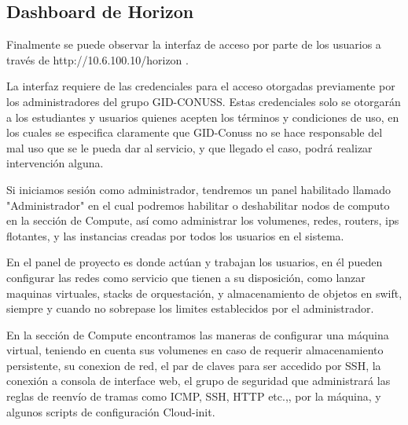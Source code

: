     \subsection{Dashboard de Horizon}
    
    Finalmente se puede observar la interfaz de acceso por parte de los usuarios a través de http://10.6.100.10/horizon .
    
    
    La interfaz requiere de las credenciales para el acceso otorgadas previamente por los administradores del grupo GID-CONUSS. Estas credenciales solo se otorgarán a los estudiantes y usuarios quienes acepten los términos y condiciones de uso, en los cuales se especifica claramente que GID-Conuss no se hace responsable del mal uso que se le pueda dar al servicio, y que llegado el caso, podrá realizar intervención alguna.
    
    
    Si iniciamos sesión como administrador, tendremos un panel habilitado llamado "Administrador" en el cual podremos habilitar o deshabilitar nodos de computo en la sección de Compute, así como administrar los volumenes, redes, routers, ips flotantes, y las instancias creadas por todos los usuarios en el sistema.
    
    
    En el panel de proyecto es donde actúan y trabajan los usuarios, en él pueden configurar las redes como servicio que tienen a su disposición, como lanzar maquinas virtuales, stacks de orquestación, y almacenamiento de objetos en swift, siempre y cuando no sobrepase los limites establecidos por el administrador.
    
    
    En la sección de Compute encontramos las maneras de configurar una máquina virtual, teniendo en cuenta sus volumenes en caso de requerir almacenamiento persistente, su conexion de red, el par de claves para ser accedido por SSH, la conexión a consola de interface web, el grupo de seguridad que administrará las reglas de reenvío de tramas como ICMP, SSH, HTTP etc.,, por la máquina, y algunos scripts de configuración Cloud-init.
    
